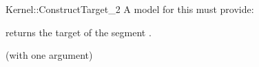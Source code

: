 \begin{ccRefFunctionObjectConcept}{Kernel::ConstructTarget_2}
A model for this must provide:


 {returns the target of
  the segment .}

\ccRefines
{} (with one argument)

\ccSeeAlso
{}

\end{ccRefFunctionObjectConcept}
